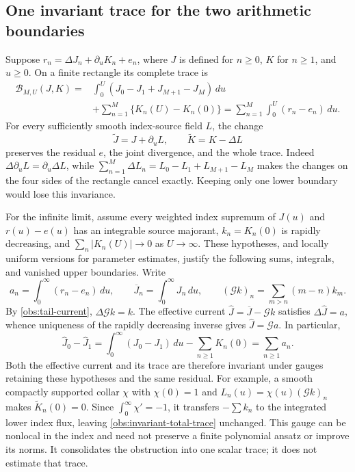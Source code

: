 \documentclass[11pt]{article}
\numberwithin{equation}{section}
\theoremstyle{definition}
\theoremstyle{remark}
\begin{document}
\subsection{One invariant trace for the two arithmetic boundaries}
\label{obs:invariant-trace-section}
Suppose $r_n=\Delta J_n+\partial_uK_n+e_n$, where $J$ is defined
for $n\ge0$, $K$ for $n\ge1$, and $u\ge0$.
On a finite rectangle its complete trace is
\begin{equation}
 \begin{split}
 \mathcal B_{M,U}(J,K)
 ={}&\int_0^U(J_0-J_1+J_{M+1}-J_M)\,du\\
    &+\sum_{n=1}^M\{K_n(U)-K_n(0)\}
 =\sum_{n=1}^M\int_0^U(r_n-e_n)\,du.
 \end{split}
 \label{obs:rectangular-trace}
\end{equation}
For every sufficiently smooth index-source field $L$, the change
\begin{equation}
 \widetilde J=J+\partial_uL,\qquad
 \widetilde K=K-\Delta L
 \label{obs:current-gauge}
\end{equation}
preserves the residual $e$, the joint divergence, and the whole trace.
Indeed $\Delta\partial_uL=\partial_u\Delta L$, while
$\sum_{n=1}^M\Delta L_n=L_0-L_1+L_{M+1}-L_M$ makes the
changes on the four sides of the rectangle cancel exactly.
Keeping only one lower boundary would lose this invariance.

For the infinite limit, assume every weighted index supremum of
$J(u)$ and $r(u)-e(u)$ has an integrable source majorant,
$k_n=K_n(0)$ is rapidly decreasing, and
$\sum_n|K_n(U)|\to0$ as $U\to\infty$.
These hypotheses, and locally uniform versions for parameter estimates,
justify the following sums, integrals, and vanished upper boundaries.
Write
\[
 a_n=\int_0^\infty(r_n-e_n)\,du,\qquad
 \overline J_n=\int_0^\infty J_n\,du,\qquad
 (\mathcal Gk)_n=\sum_{m>n}(m-n)k_m.
\]
By \eqref{obs:tail-current}, $\Delta\mathcal Gk=k$.
The effective current $\widehat J=\overline J-\mathcal Gk$
satisfies $\Delta\widehat J=a$, whence uniqueness of the rapidly
decreasing inverse gives $\widehat J=\mathcal Ga$. In particular,
\begin{equation}
 \boxed{\widehat J_0-\widehat J_1
 =\int_0^\infty(J_0-J_1)\,du-\sum_{n\ge1}K_n(0)
 =\sum_{n\ge1}a_n.}
 \label{obs:invariant-total-trace}
\end{equation}
Both the effective current and its trace are therefore invariant under
gauges retaining these hypotheses and the same residual.
For example, a smooth compactly supported collar $\chi$ with
$\chi(0)=1$ and $L_n(u)=\chi(u)(\mathcal Gk)_n$ makes
$\widetilde K_n(0)=0$. Since $\int_0^\infty\chi'=-1$, it
transfers $-\sum k_n$ to the integrated lower index flux, leaving
\eqref{obs:invariant-total-trace} unchanged.
This gauge can be nonlocal in the index and need not preserve a finite
polynomial ansatz or improve its norms. It consolidates the obstruction
into one scalar trace; it does not estimate that trace.
\end{document}
